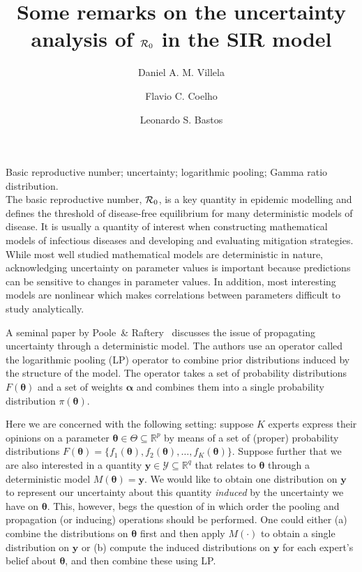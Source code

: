 \documentclass[11pt]{article}
\title{Some remarks on the uncertainty analysis of ${\cal R}_0$ in the SIR 
model}
\author[1]{Daniel A. M. Villela}
\author[3]{Flavio C. Coelho}
\author[1]{Leonardo S. Bastos}
\affil[2]{Institute of Evolutionary Biology, University of Edinburgh, United Kingdom} %
\affil[3]{School of Applied Mathematics, Getulio Vargas Foundation (FGV), Brazil,\,\emailaddress{fccoelho@fgv.br}} %
\date{\vspace{-6ex}} %
\newcommand{\keywords}[1]{\noindent{\large{\bf Keywords:}} #1\\}
\begin{document}
\maketitle

\keywords{Basic reproductive number; uncertainty; logarithmic pooling; Gamma ratio distribution.}

The basic reproductive number, ${\cal R}_0$, is a key quantity in epidemic modelling and defines the threshold of disease-free equilibrium for many  deterministic models of disease.
It is usually a quantity of interest when constructing mathematical models of infectious diseases and developing and evaluating mitigation strategies.
While most well studied mathematical models are deterministic in nature, acknowledging uncertainty on parameter values is important because predictions can be sensitive to changes in parameter values.
In addition, most interesting models are nonlinear which makes correlations between parameters difficult to study analytically.

A seminal paper by Poole~\& Raftery~\cite{poole2000} discusses the issue of propagating uncertainty through a deterministic model.
The authors use an operator called the logarithmic pooling (LP) operator to combine prior distributions induced by the structure of the model.
The operator takes a set of probability distributions $F(\boldsymbol\theta)$ and a set of weights $\boldsymbol\alpha$ and combines them into a single probability distribution $\pi(\boldsymbol\theta)$.

Here we are concerned with the following setting: suppose $K$ experts express their opinions on a parameter $\boldsymbol\theta \in \Theta \subseteq \mathbb{R}^{p}$ by means of a set of (proper) probability distributions $F(\boldsymbol\theta) = \{ f_1(\boldsymbol\theta), f_2(\boldsymbol\theta), \ldots, f_K(\boldsymbol\theta) \}$.
Suppose further that we are also interested in a quantity $\mathbf{y} \in  
\mathcal{Y}  \subseteq \mathbb{R}^{q}$ that relates to $\boldsymbol\theta $ 
through a deterministic model $M(\boldsymbol\theta) = \mathbf{y}$.
We would like to obtain one distribution on $\mathbf{y}$ to represent our uncertainty about this quantity \textit{induced} by the uncertainty we have on $\boldsymbol\theta$.
This, however, begs the question of in which order the pooling and propagation (or inducing) operations should be performed.
One could either (a) combine the distributions on $\boldsymbol\theta$ first and then apply $M(\cdot)$ to obtain a single distribution on $\mathbf{y}$ or (b) compute the induced distributions  on $\mathbf{y}$ for each expert's belief about $\boldsymbol\theta$, and then combine these using LP.
\end{document}

